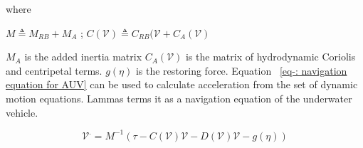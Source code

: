 \documentclass[12pt]{dalcsthesis}
\begin{document}
where 

$M \triangleq M_{RB} + M_{A}$ ; $C(\mathcal{V}) \triangleq C_{RB}(\mathcal{V} + C_{A}(\mathcal{V})$

$M_A$ is the added inertia  matrix $C_{A}(\mathcal{V})$ is the matrix of hydrodynamic Coriolis and centripetal terms. $g(\eta)$ is the restoring force.
Equation ~\ref{eq-: navigation equation for AUV} can be used to calculate acceleration from the set of dynamic motion equations. Lammas \cite{Lammas2004} terms it as a navigation equation of the underwater vehicle.   


\begin{equation}
\label{eq-: navigation equation for AUV}
\mathcal{V}^{.} = M^{-1}(\tau-C(\mathcal{V})\mathcal{V}-D(\mathcal{V})\mathcal{V}-g(\eta))
\end{equation}
\end{document}
